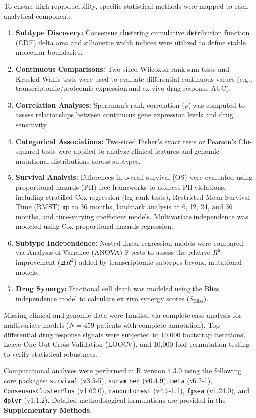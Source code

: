 \documentclass[11pt,a4paper]{article}
\begin{document}
To ensure high reproducibility, specific statistical methods were mapped to each analytical component:
\begin{enumerate}
    \item \textbf{Subtype Discovery:} Consensus clustering cumulative distribution function (CDF) delta area and silhouette width indices were utilized to define stable molecular boundaries.
    \item \textbf{Continuous Comparisons:} Two-sided Wilcoxon rank-sum tests and Kruskal-Wallis tests were used to evaluate differential continuous values (e.g., transcriptomic/proteomic expression and ex vivo drug response AUC).
    \item \textbf{Correlation Analyses:} Spearman's rank correlation ($\rho$) was computed to assess relationships between continuous gene expression levels and drug sensitivity.
    \item \textbf{Categorical Associations:} Two-sided Fisher's exact tests or Pearson's Chi-squared tests were applied to analyze clinical features and genomic mutational distributions across subtypes.
    \item \textbf{Survival Analysis:} Differences in overall survival (OS) were evaluated using proportional hazards (PH)-free frameworks to address PH violations, including stratified Cox regression (log-rank tests), Restricted Mean Survival Time (RMST) up to 36 months, landmark analysis at 6, 12, 24, and 36 months, and time-varying coefficient models. Multivariate independence was modeled using Cox proportional hazards regression.
    \item \textbf{Subtype Independence:} Nested linear regression models were compared via Analysis of Variance (ANOVA) F-tests to assess the relative $R^2$ improvement ($\Delta R^2$) added by transcriptomic subtypes beyond mutational models.
    \item \textbf{Drug Synergy:} Fractional cell death was modeled using the Bliss independence model to calculate ex vivo synergy scores ($S_{\text{Bliss}}$).
\end{enumerate}

Missing clinical and genomic data were handled via complete-case analysis for multivariate models ($N = 459$ patients with complete annotation). Top differential drug response signals were subjected to 10,000 bootstrap iterations, Leave-One-Out Cross-Validation (LOOCV), and 10,000-fold permutation testing to verify statistical robustness.

Computational analyses were performed in R version 4.3.0 using the following core packages: \texttt{survival} (v3.5-5), \texttt{survminer} (v0.4.9), \texttt{meta} (v6.2-1), \texttt{ConsensusClusterPlus} (v1.62.0), \texttt{randomForest} (v4.7-1.1), \texttt{fgsea} (v1.24.0), and \texttt{dplyr} (v1.1.2). Detailed methodological formulations are provided in the \textbf{Supplementary Methods}.
\end{document}
